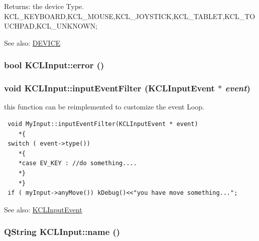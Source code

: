 \begin{Desc}
\item[Returns:]the device Type. KCL\_\-KEYBOARD,KCL\_\-MOUSE,KCL\_\-JOYSTICK,KCL\_\-TABLET,KCL\_\-TOUCHPAD,KCL\_\-UNKNOWN; \end{Desc}
\begin{Desc}
\item[See also:]\hyperlink{kclinput_8h_833b28f90e109607cd5d9e826474893a}{DEVICE} \end{Desc}
\hypertarget{class_k_c_l_input_0c3b7dd3cce5d5567c4894500074fee3}{
\subsubsection[{error}]{\setlength{\rightskip}{0pt plus 5cm}bool KCLInput::error ()}}
\label{class_k_c_l_input_0c3b7dd3cce5d5567c4894500074fee3}


\hypertarget{class_k_c_l_input_ee93fa33ec6a14baf2acf3daf23607c0}{
\subsubsection[{inputEventFilter}]{\setlength{\rightskip}{0pt plus 5cm}void KCLInput::inputEventFilter ({\bf KCLInputEvent} $\ast$ {\em event})}}
\label{class_k_c_l_input_ee93fa33ec6a14baf2acf3daf23607c0}


this function can be reimplemented to customize the event Loop. 

\begin{Code}\begin{verbatim} void MyInput::inputEventFilter(KCLInputEvent * event)
    *{
 switch ( event->type())
    *{
    *case EV_KEY : //do something....
    *}
    *}
 if ( myInput->anyMove()) kDebug()<<"you have move something...";
\end{verbatim}
\end{Code}

 \begin{Desc}
\item[See also:]\hyperlink{class_k_c_l_input_event}{KCLInputEvent} \end{Desc}
\hypertarget{class_k_c_l_input_0214f0e500c4eccdb7afacaf78019b14}{
\subsubsection[{name}]{\setlength{\rightskip}{0pt plus 5cm}QString KCLInput::name ()}}
\label{class_k_c_l_input_0214f0e500c4eccdb7afacaf78019b14}



